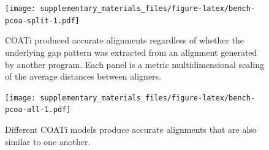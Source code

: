 \documentclass[
]{article}
\begin{document}
\begin{figure}
\centering
\texttt{[image: supplementary\_materials\_files/figure-latex/bench-pcoa-split-1.pdf]}
\caption{\label{fig:bench-pcoa-split}COATi produced accurate alignments regardless of whether the underlying gap pattern was extracted from an alignment generated by another program. Each panel is a metric multidimensional scaling of the average distances between aligners.}
\end{figure}

\begin{figure}
\centering
\texttt{[image: supplementary\_materials\_files/figure-latex/bench-pcoa-all-1.pdf]}
\caption{\label{fig:bench-pcoa-all}Different COATi models produce accurate alignments that are also similar to one another.}
\end{figure}
\end{document}
